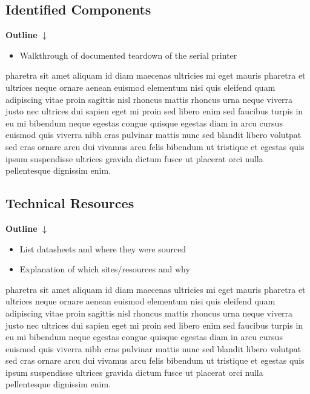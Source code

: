 \subsection{Identified Components} \label{identifiedcomponents}

\textbf{Outline}
$\downarrow$

\begin{itemize}
    \item Walkthrough of documented teardown of the serial printer
\end{itemize}

pharetra sit amet aliquam id diam maecenas ultricies mi eget mauris pharetra et ultrices neque ornare aenean euismod elementum nisi quis eleifend quam adipiscing vitae proin sagittis nisl rhoncus mattis rhoncus urna neque viverra justo nec ultrices dui sapien eget mi proin sed libero enim sed faucibus turpis in eu mi bibendum neque egestas congue quisque egestas diam in arcu cursus euismod quis viverra nibh cras pulvinar mattis nunc sed blandit libero volutpat sed cras ornare arcu dui vivamus arcu felis bibendum ut tristique et egestas quis ipsum suspendisse ultrices gravida dictum fusce ut placerat orci nulla pellentesque dignissim enim.

\subsection{Technical Resources} \label{technicalresources}


\textbf{Outline}
$\downarrow$

\begin{itemize}
    \item List datasheets and where they were sourced
    \item Explanation of which sites/resources and why
\end{itemize}

pharetra sit amet aliquam id diam maecenas ultricies mi eget mauris pharetra et ultrices neque ornare aenean euismod elementum nisi quis eleifend quam adipiscing vitae proin sagittis nisl rhoncus mattis rhoncus urna neque viverra justo nec ultrices dui sapien eget mi proin sed libero enim sed faucibus turpis in eu mi bibendum neque egestas congue quisque egestas diam in arcu cursus euismod quis viverra nibh cras pulvinar mattis nunc sed blandit libero volutpat sed cras ornare arcu dui vivamus arcu felis bibendum ut tristique et egestas quis ipsum suspendisse ultrices gravida dictum fusce ut placerat orci nulla pellentesque dignissim enim.

